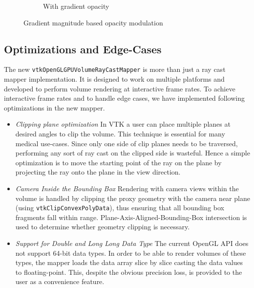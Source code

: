 \begin{figure}[htb]
\begin{subfigure}[b]{0.5\columnwidth}
    \caption{With gradient opacity}
    \label{fig:Ng2}
  \end{subfigure}
  \caption{Gradient magnitude based opacity modulation}
  \label{fig:gradient}
\end{figure}

\subsection{Optimizations and Edge-Cases} The new
\texttt{vtkOpenGLGPUVolumeRayCastMapper} is more than just a ray cast mapper
implementation. It is designed to work on multiple platforms and developed to
perform volume rendering at interactive frame rates. To achieve interactive
frame rates and to handle edge cases, we have implemented following
optimizations in the new mapper.

\begin{itemize}
  \item \emph{Clipping plane optimization} In VTK a user can place multiple
    planes at desired angles to clip the volume. This technique is essential for
    many medical use-cases. Since only one side of clip planes needs to be
    traversed, performing any sort of ray cast on the clipped side is wasteful.
    Hence a simple optimization is to move the starting point of the ray on the
    plane by projecting the ray onto the plane in the view direction.
  \item \emph{Camera Inside the Bounding Box} Rendering with camera views within
    the volume is handled by clipping the proxy geometry with the camera near
    plane (using \texttt{vtkClipConvexPolyData}), thus ensuring that all
    bounding box fragments fall within range.  Plane-Axis-Aligned-Bounding-Box
    intersection is used to determine whether geometry clipping is necessary.
  \item \emph{Support for Double and Long Long Data Type} The current OpenGL API
    does not support 64-bit data types. In order to be able to render volumes of
    these types, the mapper loads the data array slice by slice casting the data
    values to floating-point. This, despite the obvious precision loss, is
    provided to the user as a convenience feature.
\end{itemize}
